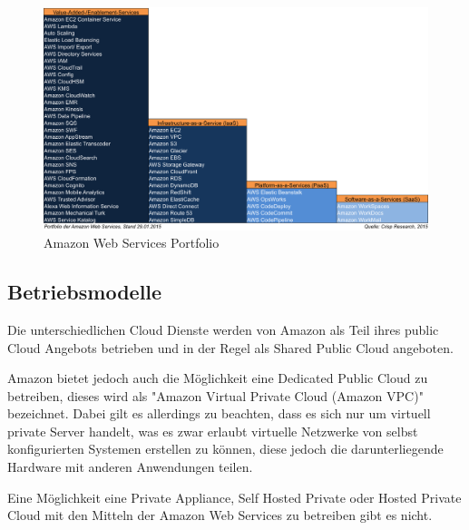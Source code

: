 \begin{figure}
	\centering
	\includegraphics[width=0.8\linewidth]{images/Crisp-AWS-Portfolio_201501291}
	\caption{Amazon Web Services Portfolio}
	\label{fig:amazon}
\end{figure}

\subsection{Betriebsmodelle}
\label{sec_amazon_deployment}
Die unterschiedlichen Cloud Dienste werden von Amazon als Teil ihres public Cloud Angebots betrieben und in der Regel als Shared Public Cloud angeboten.

Amazon bietet jedoch auch die Möglichkeit eine Dedicated Public Cloud zu betreiben, dieses wird als "Amazon Virtual Private Cloud (Amazon VPC)" bezeichnet. Dabei gilt es allerdings zu beachten, dass es sich nur um virtuell private Server handelt, was es zwar erlaubt virtuelle Netzwerke von selbst konfigurierten  Systemen erstellen zu können, diese jedoch die darunterliegende Hardware mit anderen Anwendungen teilen. 

Eine Möglichkeit eine Private Appliance, Self Hosted Private oder Hosted Private Cloud mit den Mitteln der Amazon Web Services zu betreiben gibt es nicht.